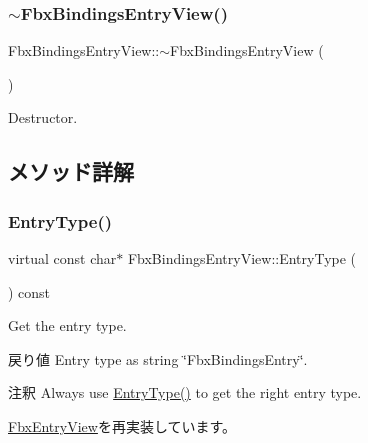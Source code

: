 \subsubsection{\texorpdfstring{$\sim$\+Fbx\+Bindings\+Entry\+View()}{~FbxBindingsEntryView()}}
{\footnotesize\ttfamily Fbx\+Bindings\+Entry\+View\+::$\sim$\+Fbx\+Bindings\+Entry\+View (\begin{DoxyParamCaption}{ }\end{DoxyParamCaption})}



Destructor. 



\subsection{メソッド詳解}
\mbox{\label{class_fbx_bindings_entry_view_a25f821ea63f19592173e7785356c04f9}} 
\subsubsection{\texorpdfstring{Entry\+Type()}{EntryType()}}
{\footnotesize\ttfamily virtual const char$\ast$ Fbx\+Bindings\+Entry\+View\+::\+Entry\+Type (\begin{DoxyParamCaption}{ }\end{DoxyParamCaption}) const\hspace{0.3cm}{\ttfamily [virtual]}}

Get the entry type. \begin{DoxyReturn}{戻り値}
Entry type as string \char`\"{}\+Fbx\+Bindings\+Entry\char`\"{}. 
\end{DoxyReturn}
\begin{DoxyRemark}{注釈}
Always use \hyperlink{class_fbx_bindings_entry_view_a25f821ea63f19592173e7785356c04f9}{Entry\+Type()} to get the right entry type. 
\end{DoxyRemark}


\hyperlink{class_fbx_entry_view_a83ee50482b441ba8b0e6d7c2dba5432f}{Fbx\+Entry\+View}を再実装しています。

\mbox{\label{class_fbx_bindings_entry_view_a1b3909ebdbe0164c910056526eedcdc6}} 
